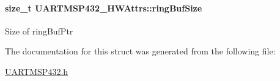\paragraph[{ring\+Buf\+Size}]{\setlength{\rightskip}{0pt plus 5cm}size\+\_\+t U\+A\+R\+T\+M\+S\+P432\+\_\+\+H\+W\+Attrs\+::ring\+Buf\+Size}\label{struct_u_a_r_t_m_s_p432___h_w_attrs_a345815030a7e198c64cefee76189dcf9}
Size of ring\+Buf\+Ptr 

The documentation for this struct was generated from the following file\+:\begin{DoxyCompactItemize}
\item 
\hyperlink{_u_a_r_t_m_s_p432_8h}{U\+A\+R\+T\+M\+S\+P432.\+h}\end{DoxyCompactItemize}
